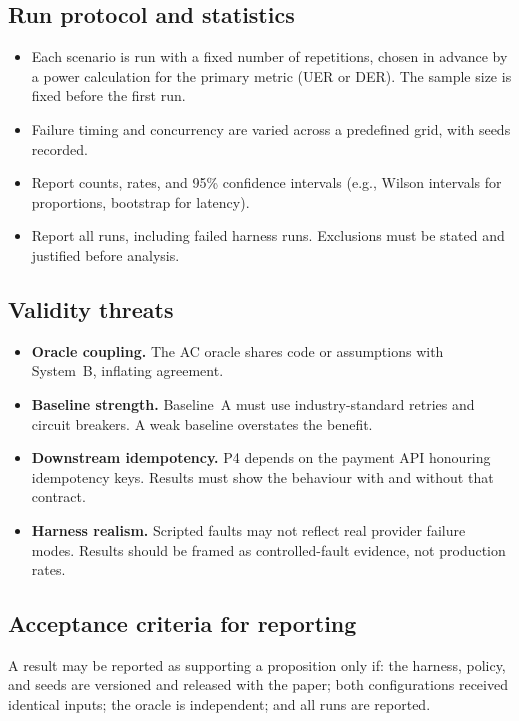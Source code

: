 \documentclass[11pt,a4paper]{article}
\begin{document}
\subsection{Run protocol and statistics}

\begin{itemize}
  \item Each scenario is run with a fixed number of repetitions, chosen in advance by a power calculation for the primary metric (UER or DER). The sample size is fixed before the first run.
  \item Failure timing and concurrency are varied across a predefined grid, with seeds recorded.
  \item Report counts, rates, and 95\% confidence intervals (e.g., Wilson intervals for proportions, bootstrap for latency).
  \item Report all runs, including failed harness runs. Exclusions must be stated and justified before analysis.
\end{itemize}

\subsection{Validity threats}

\begin{itemize}
  \item \textbf{Oracle coupling.} The AC oracle shares code or assumptions with System~B, inflating agreement.
  \item \textbf{Baseline strength.} Baseline~A must use industry-standard retries and circuit breakers. A weak baseline overstates the benefit.
  \item \textbf{Downstream idempotency.} P4 depends on the payment API honouring idempotency keys. Results must show the behaviour with and without that contract.
  \item \textbf{Harness realism.} Scripted faults may not reflect real provider failure modes. Results should be framed as controlled-fault evidence, not production rates.
\end{itemize}

\subsection{Acceptance criteria for reporting}

A result may be reported as supporting a proposition only if: the harness, policy, and seeds are versioned and released with the paper; both configurations received identical inputs; the oracle is independent; and all runs are reported.
\end{document}
